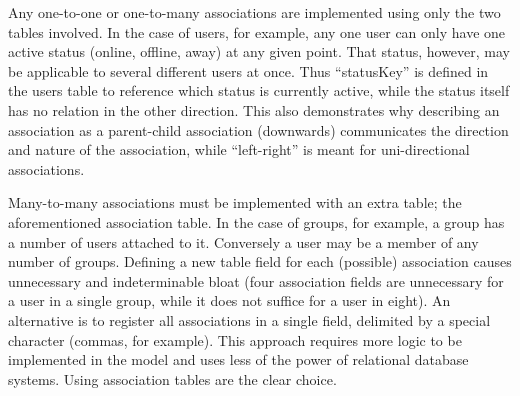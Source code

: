 Any one-to-one or one-to-many associations are implemented using only the two tables involved. In the case of users, for example, any one user can only have one active status (online, offline, away) at any given point. That status, however, may be applicable to several different users at once. Thus ``statusKey'' is defined in the users table to reference which status is currently active, while the status itself has no relation in the other direction. This also demonstrates why describing an association as a parent-child association (downwards) communicates the direction and nature of the association, while ``left-right'' is meant for uni-directional associations.

Many-to-many associations must be implemented with an extra table; the aforementioned association table. In the case of groups, for example, a group has a number of users attached to it. Conversely a user may be a member of any number of groups. Defining a new table field for each (possible) association causes unnecessary and indeterminable bloat (four association fields are unnecessary for a user in a single group, while it does not suffice for a user in eight). An alternative is to register all associations in a single field, delimited by a special character (commas, for example). This approach requires more logic to be implemented in the model and uses less of the power of relational database systems. Using association tables are the clear choice.